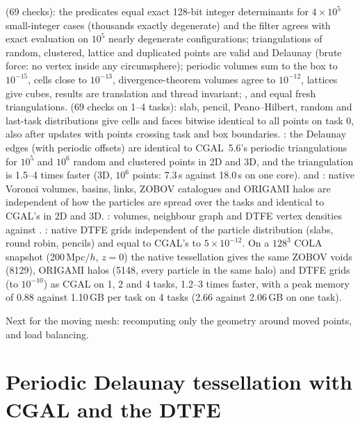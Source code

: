 \begin{validation}
 (69 checks): the predicates equal exact 128-bit integer determinants for $4\times10^5$ small-integer cases
(thousands exactly degenerate) and the filter agrees with exact evaluation on $10^5$ nearly degenerate configurations;
triangulations of random, clustered, lattice and duplicated points are valid and Delaunay (brute force: no vertex inside any
circumsphere); periodic volumes sum to the box to $10^{-15}$, cells close to $10^{-13}$, divergence-theorem volumes agree to
$10^{-12}$, lattices give cubes, results are translation and thread invariant; ,  and
 equal fresh triangulations.  (69 checks on 1--4 tasks): slab, pencil, Peano--Hilbert, random
and last-task distributions give cells and faces bitwise identical to all points on task 0, also after updates with points
crossing task and box boundaries. : the Delaunay edges (with periodic offsets) are identical to CGAL~5.6's
periodic triangulations for $10^5$ and $10^6$ random and clustered points in 2D and 3D, and the triangulation is 1.5--4 times
faster (3D, $10^6$ points: 7.3\,s against 18.0\,s on one core).  and
: native Voronoi volumes, basins, links, ZOBOV catalogues and ORIGAMI halos are independent of how
the particles are spread over the tasks and identical to CGAL's in 2D and 3D. : volumes, neighbour graph
and DTFE vertex densities against . : native DTFE grids independent of the particle distribution (slabs, round robin, pencils) and equal
to CGAL's to $5\times10^{-12}$. On a $128^3$ COLA snapshot (200\,Mpc$/h$, $z=0$) the native tessellation gives the same ZOBOV voids
(8129), ORIGAMI halos (5148, every particle in the same halo) and DTFE grids (to $10^{-10}$) as CGAL on 1, 2 and 4 tasks, 1.2--3 times
faster, with a peak memory of 0.88 against 1.10\,GB per task on 4 tasks (2.66 against 2.06\,GB on one task).
\end{validation}

\begin{planned}[Planned]
Next for the moving mesh: recomputing only the geometry around moved points, and load balancing.
\end{planned}

\section{Periodic Delaunay tessellation with CGAL and the DTFE}\label{sec:voids-dtfe}

